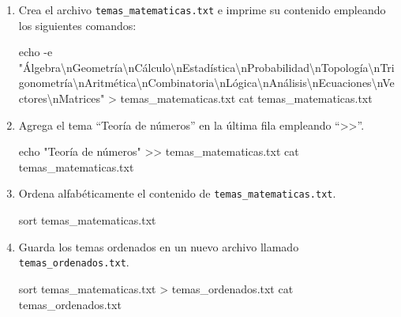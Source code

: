 \documentclass[
  spanish,
  12pt,
  letterpaper,
  DIV=11,
  numbers=noendperiod]{scrreprt}
\newenvironment{Shaded}{\begin{snugshade}}{\end{snugshade}}
\newcommand{\AttributeTok}[1]{\textcolor[rgb]{0.40,0.45,0.13}{#1}}
\newcommand{\BuiltInTok}[1]{\textcolor[rgb]{0.00,0.23,0.31}{#1}}
\newcommand{\FunctionTok}[1]{\textcolor[rgb]{0.28,0.35,0.67}{#1}}
\newcommand{\NormalTok}[1]{\textcolor[rgb]{0.00,0.23,0.31}{#1}}
\newcommand{\OperatorTok}[1]{\textcolor[rgb]{0.37,0.37,0.37}{#1}}
\newcommand{\StringTok}[1]{\textcolor[rgb]{0.13,0.47,0.30}{#1}}
\begin{document}
\begin{tcolorbox}[enhanced jigsaw, arc=.35mm, bottomrule=.15mm, bottomtitle=1mm, breakable, colback=white, colbacktitle=quarto-callout-note-color!10!white, colframe=quarto-callout-note-color-frame, coltitle=black, left=2mm, leftrule=.75mm, opacityback=0, opacitybacktitle=0.6, rightrule=.15mm, title=\textcolor{quarto-callout-note-color}{\faInfo}\hspace{0.5em}{Ejercicio 4}, titlerule=0mm, toprule=.15mm, toptitle=1mm]

\begin{enumerate}
\def\labelenumi{\arabic{enumi}.}
\item
  Crea el archivo \texttt{temas\_matematicas.txt} e imprime su contenido
  empleando los siguientes comandos:

\begin{Shaded}
\begin{Highlighting}[]
\BuiltInTok{echo} \AttributeTok{{-}e} \StringTok{"Álgebra\textbackslash{}nGeometría\textbackslash{}nCálculo\textbackslash{}nEstadística\textbackslash{}nProbabilidad\textbackslash{}nTopología\textbackslash{}nTrigonometría\textbackslash{}nAritmética\textbackslash{}nCombinatoria\textbackslash{}nLógica\textbackslash{}nAnálisis\textbackslash{}nEcuaciones\textbackslash{}nVectores\textbackslash{}nMatrices"} \OperatorTok{\textgreater{}}\NormalTok{ temas\_matematicas.txt}
\FunctionTok{cat}\NormalTok{ temas\_matematicas.txt}
\end{Highlighting}
\end{Shaded}
\item
  Agrega el tema ``Teoría de números'' en la última fila empleando
  ``\textgreater\textgreater{}''.

\begin{Shaded}
\begin{Highlighting}[]
\BuiltInTok{echo} \StringTok{"Teoría de números"} \OperatorTok{\textgreater{}\textgreater{}}\NormalTok{ temas\_matematicas.txt}
\FunctionTok{cat}\NormalTok{ temas\_matematicas.txt}
\end{Highlighting}
\end{Shaded}
\item
  Ordena alfabéticamente el contenido de
  \texttt{temas\_matematicas.txt}.

\begin{Shaded}
\begin{Highlighting}[]
\FunctionTok{sort}\NormalTok{ temas\_matematicas.txt}
\end{Highlighting}
\end{Shaded}
\item
  Guarda los temas ordenados en un nuevo archivo llamado
  \texttt{temas\_ordenados.txt}.

\begin{Shaded}
\begin{Highlighting}[]
\FunctionTok{sort}\NormalTok{ temas\_matematicas.txt }\OperatorTok{\textgreater{}}\NormalTok{ temas\_ordenados.txt}
\FunctionTok{cat}\NormalTok{ temas\_ordenados.txt}
\end{Highlighting}
\end{Shaded}
\end{enumerate}

\end{tcolorbox}
\end{document}
